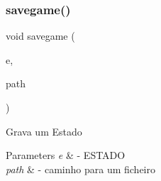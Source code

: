\subsubsection{savegame()}
{\footnotesize\ttfamily void savegame (\begin{DoxyParamCaption}\item[{\textbf{ E\+S\+T\+A\+DO} $\ast$}]{e,  }\item[{char $\ast$}]{path }\end{DoxyParamCaption})}

Grava um Estado 
\begin{DoxyParams}{Parameters}
{\em e} & -\/ E\+S\+T\+A\+DO \\
\hline
{\em path} & -\/ caminho para um ficheiro \\
\hline
\end{DoxyParams}
